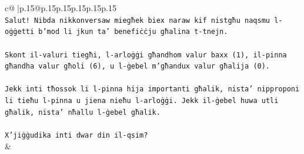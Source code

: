 \documentclass{article}
\begin{document}
{\begin{supertabular}{c@{$\;$}|p{.15\linewidth}@{}p{.15\linewidth}p{.15\linewidth}p{.15\linewidth}p{.15\linewidth}p{.15\linewidth}}
{{{\\ 
\texttt{Salut! Nibda nikkonversaw miegħek biex naraw kif nistgħu naqsmu l{-}oġġetti b'mod li jkun ta' benefiċċju għalina t{-}tnejn.} \\
\\ 
\texttt{Skont il{-}valuri tiegħi, l{-}arloġġi għandhom valur baxx (1), il{-}pinna għandha valur għoli (6), u l{-}ġebel m'għandux valur għalija (0).} \\
\\ 
\texttt{Jekk inti tħossok li l{-}pinna hija importanti għalik, nista' nipproponi li tieħu l{-}pinna u jiena nieħu l{-}arloġġi. Jekk il{-}ġebel huwa utli għalik, nista' nħallu l{-}ġebel għalik.} \\
\\ 
\texttt{X'jiġġudika inti dwar din il{-}qsim?} \\
            }
        }
    }
    & \\ \\


\end{supertabular}}
\end{document}
